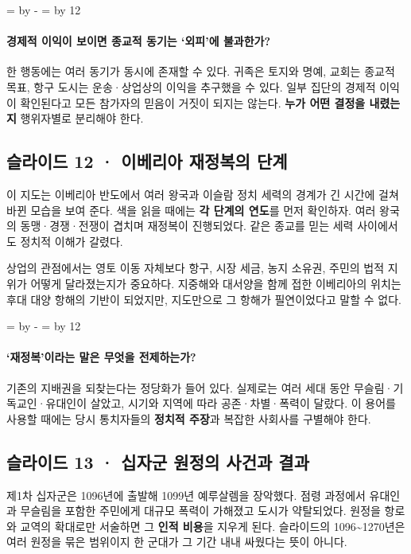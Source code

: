 \documentclass[10pt,a4paper]{article}
\newcommand{\ReserveQuestionSpace}{%
  \par\begingroup
  \dimen0=\pagegoal \advance\dimen0 by -\pagetotal
  \dimen2=\baselineskip \multiply\dimen2 by 12
  \ifdim\dimen0<\dimen2 \newpage\fi
  \endgroup}
\begin{document}
\ReserveQuestionSpace
\paragraph{경제적 이익이 보이면 종교적 동기는 ‘외피’에 불과한가?}
한 행동에는 여러 동기가 동시에 존재할 수 있다. 귀족은 토지와 명예, 교회는 종교적 목표, 항구 도시는 운송·상업상의 이익을 추구했을 수 있다. 일부 집단의 경제적 이익이 확인된다고 모든 참가자의 믿음이 거짓이 되지는 않는다. \textbf{누가 어떤 결정을 내렸는지} 행위자별로 분리해야 한다.\par

\subsection{슬라이드 12 · 이베리아 재정복의 단계}
이 지도는 이베리아 반도에서 여러 왕국과 이슬람 정치 세력의 경계가 긴 시간에 걸쳐 바뀐 모습을 보여 준다. 색을 읽을 때에는 \textbf{각 단계의 연도}를 먼저 확인하자. 여러 왕국의 동맹·경쟁·전쟁이 겹치며 재정복이 진행되었다. 같은 종교를 믿는 세력 사이에서도 정치적 이해가 갈렸다.\par

상업의 관점에서는 영토 이동 자체보다 항구, 시장 세금, 농지 소유권, 주민의 법적 지위가 어떻게 달라졌는지가 중요하다. 지중해와 대서양을 함께 접한 이베리아의 위치는 후대 대양 항해의 기반이 되었지만, 지도만으로 그 항해가 필연이었다고 말할 수 없다.\par

\ReserveQuestionSpace
\paragraph{‘재정복’이라는 말은 무엇을 전제하는가?}
기존의 지배권을 되찾는다는 정당화가 들어 있다. 실제로는 여러 세대 동안 무슬림·기독교인·유대인이 살았고, 시기와 지역에 따라 공존·차별·폭력이 달랐다. 이 용어를 사용할 때에는 당시 통치자들의 \textbf{정치적 주장}과 복잡한 사회사를 구별해야 한다.\par

\subsection{슬라이드 13 · 십자군 원정의 사건과 결과}
제1차 십자군은 1096년에 출발해 1099년 예루살렘을 장악했다. 점령 과정에서 유대인과 무슬림을 포함한 주민에게 대규모 폭력이 가해졌고 도시가 약탈되었다. 원정을 항로와 교역의 확대로만 서술하면 그 \textbf{인적 비용}을 지우게 된다. 슬라이드의 1096\textasciitilde{}1270년은 여러 원정을 묶은 범위이지 한 군대가 그 기간 내내 싸웠다는 뜻이 아니다.\par
\end{document}
